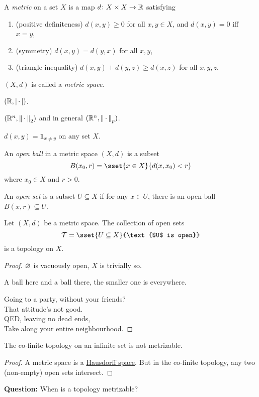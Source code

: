 \begin{definition*}[Metric] \label{def:metric}
    A \emph{metric} on a set $X$ is a map $d\colon X \times X \to \mathbb{R}$
    satisfying
    \begin{enumerate}[label=\small(M\arabic*)]
        \item (positive definiteness) $d(x, y) \ge 0$ for all $x, y \in X$,
            and $d(x, y) = 0$ iff $x = y$,
        \item (symmetry) $d(x, y) = d(y, x)$ for all $x, y$,
        \item (triangle inequality)
            $d(x, y) + d(y, z) \ge d(x, z)$ for all $x, y, z$.
    \end{enumerate}
    $(X, d)$ is called a \emph{metric space}.
\end{definition*}
\begin{examples}
    \item $(\mathbb{R}, \lvert\,\cdot\,\rvert)$.
    \item $(\mathbb{R}^n, {\lVert\,\cdot\,\rVert}_2)$ and in general
        $(\mathbb{R}^n, {\lVert\,\cdot\,\rVert}_p)$.
    \item $d(x, y) = \bm{1}_{x \ne y}$ on any set $X$.
\end{examples}

\begin{definition} \label{def:metric:open}
    An \emph{open ball} in a metric space $(X, d)$ is a subset \[
        B(x_0, r) = \sset{x \in X}{d(x, x_0) < r}
    \] where $x_0 \in X$ and $r > 0$.

    An \emph{open set} is a subset $U \subseteq X$ if for any $x \in U$,
    there is an open ball $B(x, r) \subseteq U$.
\end{definition}

\begin{theorem} \label{thm:topo:metric}
    Let $(X, d)$ be a metric space.
    The collection of open sets \[
        \T = \sset{U \subseteq X}{\text{$U$ is open}}
    \] is a topology on $X$.
\end{theorem}
\begin{proof}
    $\varnothing$ is vacuously open, $X$ is trivially so.

    A ball here and a ball there, the smaller one is everywhere.

    Going to a party, without your friends? \\
    That attitude's not good. \\
    QED, leaving no dead ends, \\
    Take along your entire neighbourhood.
\end{proof}

\begin{theorem*}
    The co-finite topology on an infinite set is not metrizable.
\end{theorem*}
\begin{proof}
    A metric space is a \href{https://en.wikipedia.org/wiki/Hausdorff_space}
    {Hausdorff space}.
    But in the co-finite topology, any two (non-empty) open sets intersect.
\end{proof}

\textbf{Question:} When is a topology metrizable?
